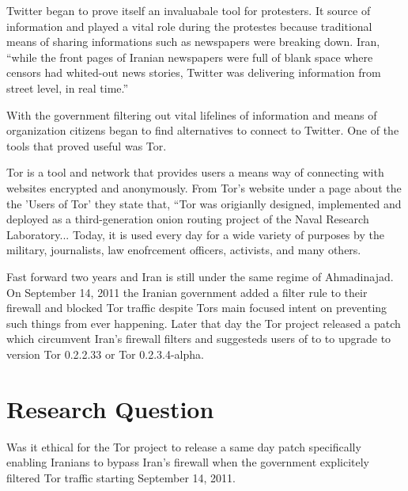 \documentclass[11pt]{article}
\begin{document}
\begin{multicols}{2}

Twitter began to prove itself an invaluabale tool for protesters. It source of
information and played a vital role during the protestes because traditional
means of sharing informations such as newspapers were breaking down. Iran,
``while the front pages of Iranian newspapers were full of blank space where
censors had whited-out news stories, Twitter was delivering information from
street level, in real time.''\cite{WhyTwitterIsTheMedium}

With the government filtering out vital lifelines of information and means of
organization citizens began to find alternatives to connect to Twitter. One of
the tools that proved useful was Tor.

Tor is a tool and network that provides users a means way of connecting with
websites encrypted and anonymously. From Tor's website under a page about the
the 'Users of Tor' they state that, ``Tor was origianlly designed, implemented
and deployed as a third-generation onion routing project of the Naval Research
Laboratory... Today, it is used every day for a wide variety of purposes by the
military, journalists, law enofrcement officers, activists, and many others.

Fast forward two years and Iran is still under the same regime of Ahmadinajad.
On September 14, 2011 the Iranian government added a filter rule to their
firewall and blocked Tor traffic despite Tors main focused intent on preventing
such things from ever happening\cite{IranBlocksTorSameDayFix}.  Later that day
the Tor project released a patch which circumvent Iran's firewall filters and
suggesteds users of to to upgrade to version Tor 0.2.2.33 or Tor
0.2.3.4-alpha\cite{IranBlocksTorSameDayFix}.






\section{Research Question} 

Was it ethical for the Tor project to release a same day patch specifically
enabling Iranians to bypass Iran's firewall when the government explicitely
filtered Tor traffic starting September 14, 2011.


\end{multicols}
\end{document}
